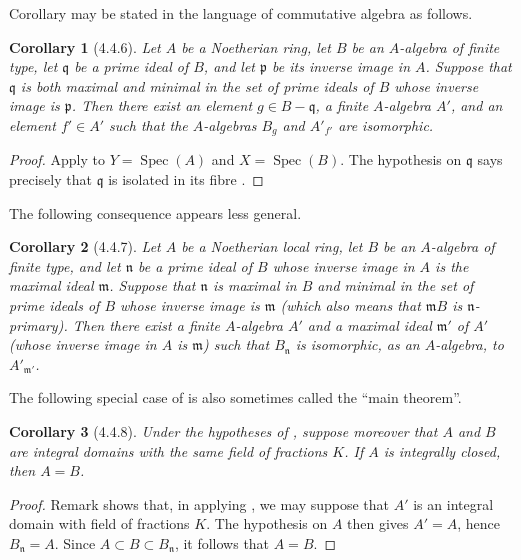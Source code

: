 \documentclass[oneside]{amsart}
\theoremstyle{ega-env-style}
\theoremstyle{ega-thm-env-style}
\newtheorem*{corollary}{Corollary}
\theoremstyle{ega-defn-env-style}
\def\Spec{\operatorname{Spec}}
\newcommand{\oldpage}[2][]{{\marginnote{\normalfont{\textbf{#1}~|~#2}}}\ignorespaces}
\let\EGAOriginalLabel\label
\renewcommand{\label}[1]{\phantomsection\EGAOriginalLabel{#1}}
\begin{document}
Corollary  may be stated in the language of
commutative algebra as follows.

\begin{corollary}[4.4.6]
\label{III.4.4.6}
Let $A$ be a Noetherian ring, let $B$ be an $A$-algebra of finite
type, let $\mathfrak q$ be a prime ideal of $B$, and let $\mathfrak p$
be its inverse image in $A$.  Suppose that $\mathfrak q$ is both
maximal and minimal in the set of prime ideals of $B$ whose inverse
image is $\mathfrak p$.  Then there exist an element
$g\in B-\mathfrak q$, a finite $A$-algebra $A'$, and an element
$f'\in A'$ such that the $A$-algebras $B_g$ and $A'_{f'}$ are
isomorphic.
\end{corollary}

\begin{proof}
Apply  to $Y=\Spec(A)$ and $X=\Spec(B)$.  The
hypothesis on $\mathfrak q$ says precisely that $\mathfrak q$ is
isolated in its fibre .
\end{proof}

The following consequence appears less general.

\oldpage[III]{137}

\begin{corollary}[4.4.7]
\label{III.4.4.7}
Let $A$ be a Noetherian local ring, let $B$ be an $A$-algebra of
finite type, and let $\mathfrak n$ be a prime ideal of $B$ whose
inverse image in $A$ is the maximal ideal $\mathfrak m$.  Suppose
that $\mathfrak n$ is maximal in $B$ and minimal in the set of prime
ideals of $B$ whose inverse image is $\mathfrak m$ (which also means
that $\mathfrak mB$ is $\mathfrak n$-primary).  Then there exist a
finite $A$-algebra $A'$ and a maximal ideal $\mathfrak m'$ of $A'$
(whose inverse image in $A$ is $\mathfrak m$) such that $B_{\mathfrak
n}$ is isomorphic, as an $A$-algebra, to $A'_{\mathfrak m'}$.
\end{corollary}

The following special case of  is also sometimes
called the ``main theorem''.

\begin{corollary}[4.4.8]
\label{III.4.4.8}
Under the hypotheses of , suppose moreover that $A$
and $B$ are integral domains with the same field of fractions $K$.
If $A$ is integrally closed, then $A=B$.
\end{corollary}

\begin{proof}
Remark  shows that, in applying
, we may suppose that $A'$ is an integral domain
with field of fractions $K$.  The hypothesis on $A$ then gives
$A'=A$, hence $B_{\mathfrak n}=A$.  Since
$A\subset B\subset B_{\mathfrak n}$, it follows that $A=B$.
\end{proof}
\end{document}
